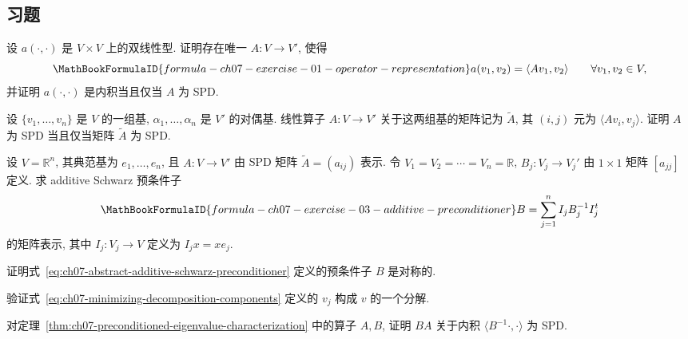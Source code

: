 \subsection{习题}
\label{sec:ch07-exercises}
\setcounter{exerciseitem}{0}

\begin{MBExercise}
\label{exr:ch07-01}
设 $a(\cdot,\cdot)$ 是 $V\times V$ 上的双线性型. 证明存在唯一 $A:V\longrightarrow V'$, 使得
\[
\MathBookFormulaID{formula-ch07-exercise-01-operator-representation}
a(v_1,v_2)=\langle Av_1,v_2\rangle
\qquad\forall v_1,v_2\in V,
\]
并证明 $a(\cdot,\cdot)$ 是内积当且仅当 $A$ 为 SPD.
\end{MBExercise}

\begin{MBExercise}
\label{exr:ch07-02}
设 $\{v_1,\ldots,v_n\}$ 是 $V$ 的一组基, $\alpha_1,\ldots,\alpha_n$ 是 $V'$ 的对偶基. 线性算子 $A:V\longrightarrow V'$ 关于这两组基的矩阵记为 $\widetilde A$, 其 $(i,j)$ 元为 $\langle Av_i,v_j\rangle$. 证明 $A$ 为 SPD 当且仅当矩阵 $\widetilde A$ 为 SPD.
\end{MBExercise}

\begin{MBExercise}
\label{exr:ch07-03}
设 $V=\mathbb R^n$, 其典范基为 $e_1,\ldots,e_n$, 且 $A:V\longrightarrow V'$ 由 SPD 矩阵 $\widetilde A=(a_{ij})$ 表示. 令 $V_1=V_2=\cdots=V_n=\mathbb R$, $B_j:V_j\longrightarrow V_j'$ 由 $1\times1$ 矩阵 $[a_{jj}]$ 定义. 求 additive Schwarz 预条件子
\[
\MathBookFormulaID{formula-ch07-exercise-03-additive-preconditioner}
B=\sum_{j=1}^{n}I_jB_j^{-1}I_j^t
\]
的矩阵表示, 其中 $I_j:V_j\longrightarrow V$ 定义为 $I_jx=xe_j$.
\end{MBExercise}

\begin{MBExercise}
\label{exr:ch07-04}
证明式~\eqref{eq:ch07-abstract-additive-schwarz-preconditioner} 定义的预条件子 $B$ 是对称的.
\end{MBExercise}

\begin{MBExercise}
\label{exr:ch07-05}
验证式~\eqref{eq:ch07-minimizing-decomposition-components} 定义的 $v_j$ 构成 $v$ 的一个分解.
\end{MBExercise}

\begin{MBExercise}
\label{exr:ch07-06}
对定理~\ref{thm:ch07-preconditioned-eigenvalue-characterization} 中的算子 $A,B$, 证明 $BA$ 关于内积 $\langle B^{-1}\cdot,\cdot\rangle$ 为 SPD.
\end{MBExercise}

